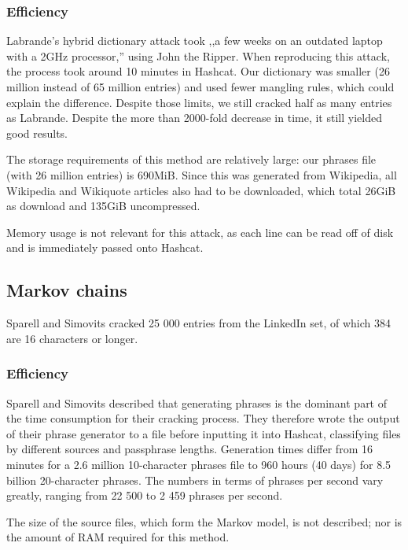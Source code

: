 \documentclass{article}
\begin{document}
\subsubsection{Efficiency}

Labrande's hybrid dictionary attack took ,,a few weeks on an outdated laptop
with a 2GHz processor,'' using John the Ripper. When reproducing this attack,
the process took around 10 minutes in Hashcat. Our dictionary was smaller (26
million instead of 65 million entries) and used fewer mangling rules, which
could explain the difference. Despite those limits, we still cracked half as
many entries as Labrande. Despite the more than 2000-fold decrease in time, it
still yielded good results.

The storage requirements of this method are relatively large: our phrases file
(with 26 million entries) is 690MiB. Since this was generated from Wikipedia,
all Wikipedia and Wikiquote articles also had to be downloaded, which total
26GiB as download and 135GiB uncompressed.

Memory usage is not relevant for this attack, as each line can be read off of
disk and is immediately passed onto Hashcat.


\subsection{Markov chains}

Sparell and Simovits cracked 25 000 entries from the LinkedIn set, of which 384
are 16 characters or longer.

\subsubsection{Efficiency}

Sparell and Simovits described that generating phrases is the dominant part of
the time consumption for their cracking process. They therefore wrote the
output of their phrase generator to a file before inputting it into Hashcat,
classifying files by different sources and passphrase lengths. Generation times
differ from 16 minutes for a 2.6 million 10-character phrases file to 960 hours
(40 days) for 8.5 billion 20-character phrases. The numbers in terms of phrases
per second vary greatly, ranging from 22 500 to 2 459 phrases per second.

The size of the source files, which form the Markov model, is not described;
nor is the amount of RAM required for this method.
\end{document}
